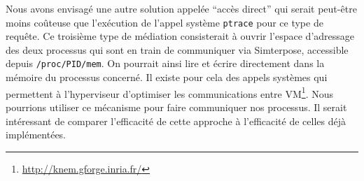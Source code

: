 Nous avons envisagé une autre solution appelée ``accès direct'' qui serait peut-être moins coûteuse que l'exécution de l'appel système \texttt{ptrace} pour ce type de requête. Ce troisième type de médiation consisterait à ouvrir l'espace d'adressage des deux processus qui sont en train de communiquer via Simterpose, accessible depuis \texttt{/proc/PID/mem}. On pourrait ainsi lire et écrire directement dans la mémoire du processus concerné. Il existe pour cela des appels systèmes qui permettent à l'hyperviseur d'optimiser les communications entre VM\footnote{\url{http://knem.gforge.inria.fr/}}. Nous pourrions utiliser ce mécanisme pour faire communiquer nos processus. Il serait intéressant de comparer l'efficacité de cette approche à l'efficacité de celles déjà implémentées.

